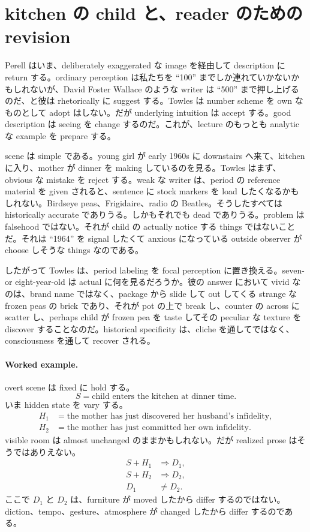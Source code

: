 \section{kitchen の child と、reader のための revision}

Perell はいま、deliberately exaggerated な image を経由して description に return する。ordinary perception は私たちを ``100'' までしか連れていかないかもしれないが、David Foster Wallace のような writer は ``500'' まで押し上げるのだ、と彼は rhetorically に suggest する。Towles は number scheme を own なものとして adopt はしない。だが underlying intuition は accept する。good description は seeing を change するのだ。これが、lecture のもっとも analytic な example を prepare する。

scene は simple である。young girl が early 1960s に downstairs へ来て、kitchen に入り、mother が dinner を making しているのを見る。Towles はまず、obvious な mistake を reject する。weak な writer は、period の reference material を given されると、sentence に stock markers を load したくなるかもしれない。Birdseye peas、Frigidaire、radio の Beatles。そうしたすべては historically accurate でありうる。しかもそれでも dead でありうる。problem は falsehood ではない。それが child の actually notice する things ではないことだ。それは ``1964'' を signal したくて anxious になっている outside observer が choose しそうな things なのである。

したがって Towles は、period labeling を focal perception に置き換える。seven- or eight-year-old は actual に何を見るだろうか。彼の answer において vivid なのは、brand name ではなく、package から slide して out してくる strange な frozen peas の brick であり、それが pot の上で break し、counter の across に scatter し、perhaps child が frozen pea を taste してその peculiar な texture を discover することなのだ。historical specificity は、cliche を通してではなく、consciousness を通して recover される。

\paragraph{Worked example.}

overt scene は fixed に hold する。
\begin{equation}
S = \text{child enters the kitchen at dinner time}.
\end{equation}
いま hidden state を vary する。
\begin{align}
H_1 &= \text{the mother has just discovered her husband's infidelity}, \\
H_2 &= \text{the mother has just committed her own infidelity}.
\end{align}
visible room は almost unchanged のままかもしれない。だが realized prose はそうではありえない。
\begin{align}
S + H_1 &\Rightarrow D_1, \\
S + H_2 &\Rightarrow D_2, \\
D_1 &\neq D_2.
\end{align}
ここで \(D_1\) と \(D_2\) は、furniture が moved したから differ するのではない。diction、tempo、gesture、atmosphere が changed したから differ するのである。

